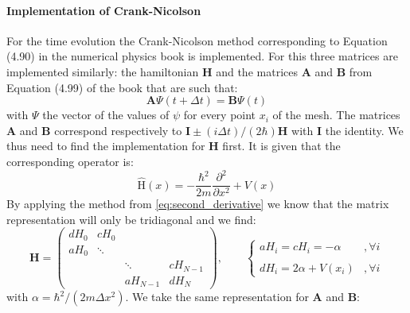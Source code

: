 \paragraph{Implementation of Crank-Nicolson} For the time evolution the Crank-Nicolson method corresponding to Equation (4.90) in the numerical physics book \cite{physnumbook} is implemented. For this three matrices are implemented similarly: the hamiltonian $\mathbf{H}$ and the matrices $\mathbf{A}$ and $\mathbf{B}$ from Equation (4.99) of the book \cite{physnumbook} that are such that:
\begin{equation}
    \mathbf{A} \Psi(t+\Delta t) = \mathbf{B} \Psi(t)
\end{equation}
with $\Psi$ the vector of the values of $\psi$ for every point $x_i$ of the mesh. The matrices $\mathbf{A}$ and $\mathbf{B}$ correspond respectively to $\mathbf{I} \pm (i \Delta t)/(2\hbar) \mathbf{H}$ with $\mathbf{I}$ the identity. We thus need to find the implementation for $\mathbf{H}$ first. It is given that the corresponding operator is:
\begin{equation}
    \hat{\mathrm{H}}(x) = -\frac{\hbar^2}{2m}\frac{\partial^2}{\partial x^2} + V(x)
\end{equation}
By applying the method from \autoref{eq:second_derivative} we know that the matrix representation will only be tridiagonal and we find:
\begin{equation}
    \mathbf{H} = \left( \begin{matrix}
        dH_0 & cH_0      &          &   \\
        aH_0 & \ddots    &          &   \\
             &           & \ddots   & cH_{N-1} \\
             &           & aH_{N-1} & dH_N
        \end{matrix} \right)
        , \qquad 
        \begin{cases} aH_i = cH_i = -\alpha &, \forall i \\
        &\\
        dH_i = 2\alpha + V(x_i) &, \forall i
        \end{cases}
        \label{eq:H_matrix}
\end{equation}
with $\alpha = \hbar^2/(2m\Delta x^2)$. We take the same representation for $\mathbf{A}$ and $\mathbf{B}$:
